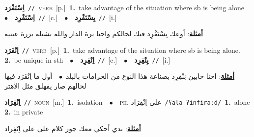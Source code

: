 \documentclass[10pt,a4paper,twoside]{article} %
\begin{document}
\begin{multicols}{2}
{\setlength\topsep{0pt}\textbf{\foreignlanguage{arabic}{اِسْتَفْرَد}}\ {\color{gray}\texttt{//}\color{black}}\ \textsc{verb}\ [p.]\ \textbf{1.}~take advantage of the situation where sb is being alone\ \ $\bullet$\ \ \setlength\topsep{0pt}\textbf{\foreignlanguage{arabic}{اِسْتَفْرِد}}\ {\color{gray}\texttt{//}\color{black}}\ [c.]\ \ $\bullet$\ \ \setlength\topsep{0pt}\textbf{\foreignlanguage{arabic}{يِسْتَفْرِد}}\ {\color{gray}\texttt{//}\color{black}}\ [i.]\  \begin{flushright}\color{gray}\foreignlanguage{arabic}{\textbf{\underline{\foreignlanguage{arabic}{أمثلة}}}: أوعك يِسْتَفْرِد فيك لحالكم واحنا برة الدار والله بشيله بزرة عينيه}\end{flushright}\color{black}} \vspace{2mm}

{\setlength\topsep{0pt}\textbf{\foreignlanguage{arabic}{اِنْفَرَد}}\ {\color{gray}\texttt{//}\color{black}}\ \textsc{verb}\ [p.]\ \textbf{1.}~take advantage of the situation where sb is being alone.  \textbf{2.}~be unique in sth\ \ $\bullet$\ \ \setlength\topsep{0pt}\textbf{\foreignlanguage{arabic}{اِنْفِرِد}}\ {\color{gray}\texttt{//}\color{black}}\ [c.]\ \ $\bullet$\ \ \setlength\topsep{0pt}\textbf{\foreignlanguage{arabic}{يِنْفِرِد}}\ {\color{gray}\texttt{//}\color{black}}\ [i.]\  \begin{flushright}\color{gray}\foreignlanguage{arabic}{\textbf{\underline{\foreignlanguage{arabic}{أمثلة}}}: احنا حابين نِنْفِرِد بصناعة هذا النوع من الحرامات بالبلد\ $\bullet$\ \  أول ما اِنْفَرَد فيها لحالهم صار يفهلق مثل الأهتر}\end{flushright}\color{black}} \vspace{2mm}

{\setlength\topsep{0pt}\textbf{\foreignlanguage{arabic}{اِنْفِرَاد}}\ {\color{gray}\texttt{//}\color{black}}\ \textsc{noun}\ [m.]\ \textbf{1.}~isolation\ \ $\bullet$\ \ \textsc{ph.} \color{gray} \foreignlanguage{arabic}{على اِنْفِرَاد}\color{black}\ {\color{gray}\texttt{/{\sffamily ʕala ʔinfiraːd}/}\color{black}}\ \textbf{1.}~alone  \textbf{2.}~in private\  \begin{flushright}\color{gray}\foreignlanguage{arabic}{\textbf{\underline{\foreignlanguage{arabic}{أمثلة}}}: بدي أحكي معك جوز كلام على  على اِنْفِراد}\end{flushright}\color{black}} \vspace{2mm}


\end{multicols}
\end{document}
